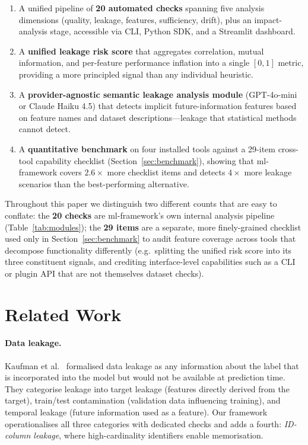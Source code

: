 \documentclass[11pt]{article}
\begin{document}
\begin{enumerate}[leftmargin=*,itemsep=2pt]
  \item A unified pipeline of \textbf{20 automated checks} spanning five
        analysis dimensions (quality, leakage, features, sufficiency, drift),
        plus an impact-analysis stage, accessible via CLI, Python SDK, and a
        Streamlit dashboard.
  \item A \textbf{unified leakage risk score} that aggregates correlation,
        mutual information, and per-feature performance inflation into a single
        $[0,1]$ metric, providing a more principled signal than any individual
        heuristic.
  \item A \textbf{provider-agnostic semantic leakage analysis module} (GPT-4o-mini
        or Claude Haiku 4.5)
        that detects implicit future-information features based on feature
        names and dataset descriptions---leakage that statistical methods
        cannot detect.
  \item A \textbf{quantitative benchmark} on four installed tools against a
        29-item cross-tool capability checklist (Section~\ref{sec:benchmark}),
        showing that ml-framework covers $2.6\times$ more checklist items and
        detects $4\times$ more leakage scenarios than the best-performing
        alternative.
\end{enumerate}

Throughout this paper we distinguish two different counts that are easy to
conflate: the \textbf{20 checks} are ml-framework's own internal analysis
pipeline (Table~\ref{tab:modules}); the \textbf{29 items} are a separate,
more finely-grained checklist used only in Section~\ref{sec:benchmark} to
audit feature coverage across tools that decompose functionality
differently (e.g.\ splitting the unified risk score into its three
constituent signals, and crediting interface-level capabilities such as a
CLI or plugin API that are not themselves dataset checks).

\section{Related Work}
\label{sec:related}

\paragraph{Data leakage.}
Kaufman et al.~\cite{kaufman2012leakage} formalised data leakage as any
information about the label that is incorporated into the model but would not
be available at prediction time.  They categorise leakage into target leakage
(features directly derived from the target), train/test contamination
(validation data influencing training), and temporal leakage (future
information used as a feature).  Our framework operationalises all three
categories with dedicated checks and adds a fourth: \emph{ID-column leakage},
where high-cardinality identifiers enable memorisation.
\end{document}
